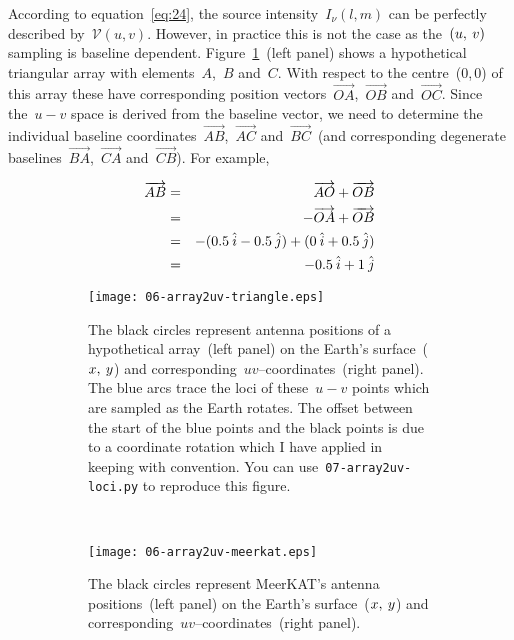 According to equation~\eqref{eq:24}, the source intensity~$I_\nu (l, m)$ can be perfectly described by~$\mathcal{V}(u, v)$. However, in practice this is not the case as the~$(u,\msp v)$ sampling is baseline dependent. Figure~\ref{fig:06-array2uv-triangle}~(left panel) shows a hypothetical triangular array with elements~$A$,~$B$ and~$C$. With respect to the centre~(0,\,0) of this array these have corresponding position vectors~$\overrightarrow{OA}$,~$\overrightarrow{OB}$ and~$\overrightarrow{OC}$. Since the~$u-v$ space is derived from the baseline vector, we need to determine the individual baseline coordinates~$\overrightarrow{AB}$,~$\overrightarrow{AC}$ and~$\overrightarrow{BC}$~(and corresponding degenerate baselines~$\overrightarrow{BA}$,~$\overrightarrow{CA}$ and~$\overrightarrow{CB}$). For example,

\begin{eqnarray}
  \label{eq:26}
  \overrightarrow{AB} &=&  \enspace \overrightarrow{AO} + \overrightarrow{OB} \nonumber \\
                      &=& -\overrightarrow{OA} + \overrightarrow{OB} \nonumber \\
                      &=& -(0.5\msp \hat{i} - 0.5\msp \hat{j}) + (0\msp \hat{i} + 0.5\msp \hat{j}) \nonumber \\
                      &=& -0.5\msp \hat{i} + 1\msp \hat{j} \nonumber
\end{eqnarray}

\begin{figure}
\begin{subfigure}[b]{\textwidth }
  \centering
  \texttt{[image: 06-array2uv-triangle.eps]}
  \caption{The black circles represent antenna positions of a hypothetical array~(left panel) on the Earth's surface~($x,\msp y$) and corresponding~$uv$--coordinates~(right panel). The blue arcs trace the loci of these~$u-v$ points which are sampled as the Earth rotates. The offset between the start of the blue points and the black points is due to a coordinate rotation which I have applied in keeping with convention. You can use~\texttt{07-array2uv-loci.py} to reproduce this figure.\\}
  \label{fig:06-array2uv-triangle}
\end{subfigure}\\
\begin{subfigure}[b]{\textwidth }
  \centering
  \texttt{[image: 06-array2uv-meerkat.eps]}
  \caption{The black circles represent MeerKAT's antenna positions~(left panel) on the Earth's surface~($x,\msp y$) and corresponding~$uv$--coordinates~(right panel).}
  \label{fig:07-array2uv-meerkat}
\end{subfigure}
\caption{}
\label{fig:xy-uv}
\end{figure}

